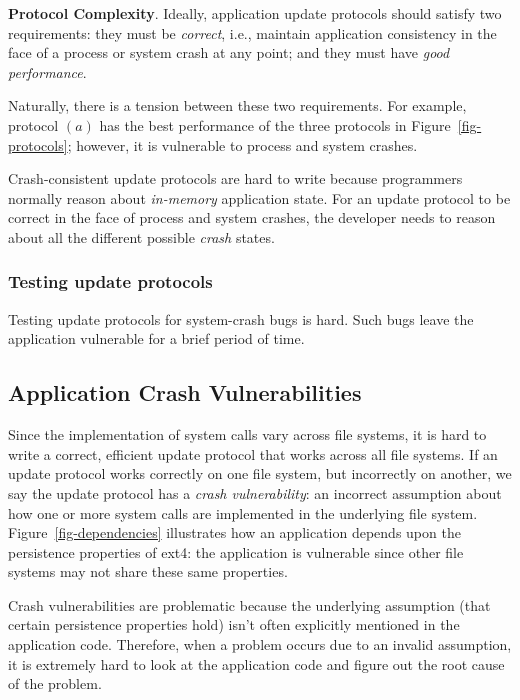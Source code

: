 \textbf{Protocol Complexity}. Ideally, application update protocols should
satisfy two requirements: they must be \textit{correct}, i.e., maintain
application consistency in the face of a process or system crash at any point;
and they must have \textit{good performance}.  

Naturally, there is a tension between these two requirements. For example,
protocol $(a)$ has the best performance of the three protocols in
Figure~\ref{fig-protocols}; however, it is vulnerable to process and system
crashes.   

Crash-consistent update protocols are hard to write because programmers normally
reason about \textit{in-memory} application state. For an update protocol to be
correct in the face of process and system crashes, the developer needs to
reason about all the different possible \textit{crash} states.  

\subsubsection{Testing update protocols}
Testing update protocols for system-crash bugs is hard. Such bugs leave the
application vulnerable for a brief period of time.   
\fi




\subsection{Application Crash Vulnerabilities}


Since the implementation of system calls vary across file systems, it is hard
to write a correct, efficient update protocol that works across all file
systems. If an update protocol works correctly on one file system, but
incorrectly on another, we say the update protocol has a \textit{crash
vulnerability}: an incorrect assumption about how one or more system calls are
implemented in the underlying file system.  Figure~\ref{fig-dependencies}
illustrates how an application depends upon the persistence properties of ext4:
the application is vulnerable since other file systems may not share these same
properties. 

Crash vulnerabilities are problematic because the underlying assumption (that
certain persistence properties hold) isn't often explicitly mentioned in the
application code. Therefore, when a problem occurs due to an invalid
assumption, it is extremely hard to look at the application code and figure out
the root cause of the problem.  
